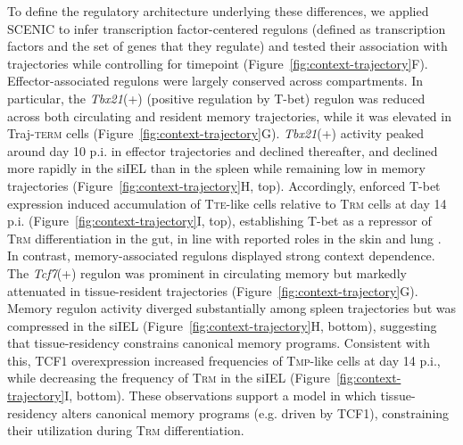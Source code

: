 To define the regulatory architecture underlying these differences, we applied SCENIC \citep{aibarSCENICSinglecellRegulatory2017, vandesandeScalableSCENICWorkflow2020} to infer transcription factor-centered regulons (defined as transcription factors and the set of genes that they regulate) and tested their association with trajectories while controlling for timepoint (Figure~\ref{fig:context-trajectory}F). Effector-associated regulons were largely conserved across compartments. In particular, the \emph{Tbx21}(+) (positive regulation by T-bet) regulon was reduced across both circulating and resident memory trajectories, while it was elevated in Traj-\textsc{term} cells (Figure~\ref{fig:context-trajectory}G). \emph{Tbx21}(+) activity peaked around day 10 p.i. in effector trajectories and declined thereafter, and declined more rapidly in the siIEL than in the spleen while remaining low in memory trajectories (Figure~\ref{fig:context-trajectory}H, top). Accordingly, enforced T-bet expression induced accumulation of T\textsc{te-}like cells relative to T\textsc{rm} cells at day 14 p.i. (Figure~\ref{fig:context-trajectory}I, top), establishing T-bet as a repressor of T\textsc{rm} differentiation in the gut, in line with reported roles in the skin and lung \citep{mackayTboxTranscriptionFactors2015, yuEpigeneticLandscapesReveal2017, laidlawCD4CellHelp2014}. In contrast, memory-associated regulons displayed strong context dependence. The \emph{Tcf7}(+) regulon was prominent in circulating memory but markedly attenuated in tissue-resident trajectories (Figure~\ref{fig:context-trajectory}G). Memory regulon activity diverged substantially among spleen trajectories but was compressed in the siIEL (Figure~\ref{fig:context-trajectory}H, bottom), suggesting that tissue-residency constrains canonical memory programs. Consistent with this, TCF1 overexpression increased frequencies of T\textsc{mp}-like cells at day 14 p.i., while decreasing the frequency of T\textsc{rm} in the siIEL (Figure~\ref{fig:context-trajectory}I, bottom). These observations support a model in which tissue-residency alters canonical memory programs (e.g. driven by TCF1), constraining their utilization during T\textsc{rm} differentiation.

